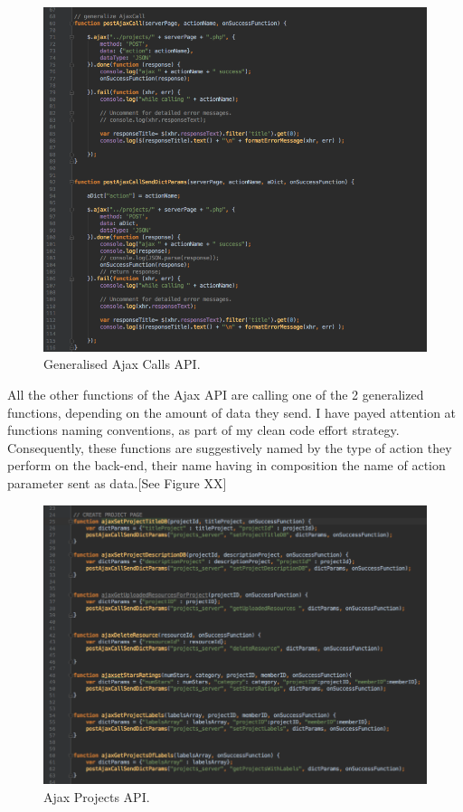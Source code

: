 \begin{figure}
\includegraphics[width=1\linewidth]{images/GeneralisedAjaxCallsAPI.png}
\caption{Generalised Ajax Calls API.}
\label{fig:gen_ajax_calls}
\end{figure}

All the other functions of the Ajax API are calling one of the 2 generalized functions, depending on the amount of data they send. 
I have payed attention at functions naming conventions, as part of my clean code effort strategy. Consequently, these functions are suggestively named by the type of action they perform on the back-end, their name having in composition the name of action parameter sent as data.[See Figure XX] \\

\begin{figure}
\includegraphics[width=1\linewidth]{images/AjaxProjectsAPI.png}
\caption{Ajax Projects API.}
\label{fig:ajax_projects_API}
\end{figure}


